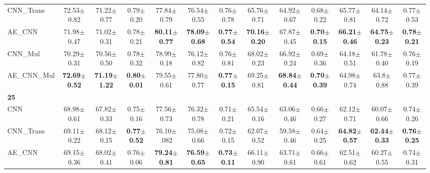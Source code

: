 \begin{table}[ht]
\begin{adjustbox}{width=\textwidth}
\begin{tabular}{lcccccccccccc}
CNN\_Trans         & 72.53$\pm$0.82          & 71.22$\pm$0.77          & 0.79$\pm$0.20          & 77.84$\pm$0.79          & 76.54$\pm$0.55          & 0.76$\pm$0.78          & 65.76$\pm$0.71          & 64.92$\pm$0.67          & 0.68$\pm$0.22          & 65.77$\pm$0.81          & 64.14$\pm$0.72          & 0.77$\pm$0.53          \\
AE\_CNN               & 71.98$\pm$0.47          & 71.02$\pm$0.31          & 0.78$\pm$0.21          & \textbf{80.11$\pm$0.77} & \textbf{78.09$\pm$0.68} & \textbf{0.77$\pm$0.54} & \textbf{70.16$\pm$0.20} & 67.87$\pm$0.45          & \textbf{0.70$\pm$0.15} & \textbf{66.21$\pm$0.46} & \textbf{64.75$\pm$0.23} & \textbf{0.78$\pm$0.21} \\
CNN\_Mul        & 70.29$\pm$0.31          & 70.56$\pm$0.50          & 0.78$\pm$0.32          & 78.99$\pm$0.18          & 76.12$\pm$0.82          & 0.76$\pm$0.81          & 68.02$\pm$0.23          & 66.92$\pm$0.24          & 0.69$\pm$0.36          & 64.18$\pm$0.51          & 61.78$\pm$0.40          & 0.76$\pm$0.19          \\
AE\_CNN\_Mul    & \textbf{72.69$\pm$0.52} & \textbf{71.19$\pm$1.22} & \textbf{0.80$\pm$0.01} & 79.55$\pm$0.61          & 77.80$\pm$0.77          & \textbf{0.77$\pm$0.15} & 69.25$\pm$0.81          & \textbf{68.84$\pm$0.44} & \textbf{0.70$\pm$0.39} & 64.98$\pm$0.74          & 63.8$\pm$0.88           & 0.77$\pm$0.39          \\ \hline
\textbf{25}&&&&&&&&&&&& \\
CNN                   & 68.98$\pm$0.61          & 67.82$\pm$0.33          & 0.75$\pm$0.16          & 77.56$\pm$0.73          & 76.32$\pm$0.78          & 0.71$\pm$0.21          & 65.54$\pm$0.16          & 63.06$\pm$0.46          & 0.66$\pm$0.27          & 62.12$\pm$0.71          & 60.07$\pm$0.66          & 0.74$\pm$0.26          \\
CNN\_Trans         & 69.11$\pm$0.22          & 68.12$\pm$0.15          & \textbf{0.77$\pm$0.52} & 76.10$\pm$.082          & 75.08$\pm$0.66          & 0.72$\pm$0.15          & 62.07$\pm$0.52          & 59.58$\pm$0.46          & 0.64$\pm$0.25          & \textbf{64.82$\pm$0.57} & \textbf{62.44$\pm$0.33} & \textbf{0.76$\pm$0.25} \\
AE\_CNN               & 69.15$\pm$0.36          & 68.02$\pm$0.41          & 0.76$\pm$0.06          & \textbf{79.24$\pm$0.81} & \textbf{76.59$\pm$0.65} & \textbf{0.73$\pm$0.11} & 66.11$\pm$0.90          & 63.71$\pm$0.61          & 0.66$\pm$0.61          & 62.51$\pm$0.62          & 60.27$\pm$0.55          & 0.74$\pm$0.31          \\

\end{tabular}
\end{adjustbox}
\end{table}
